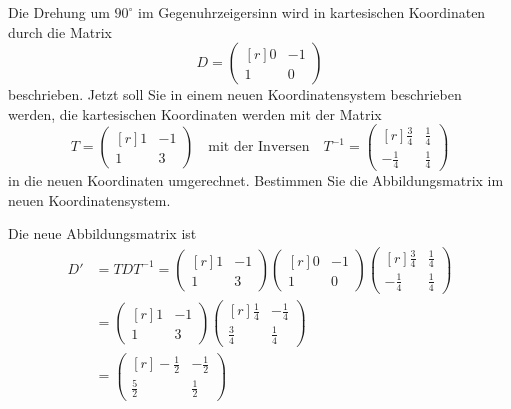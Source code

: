 Die Drehung um $90^\circ$ im Gegenuhrzeigersinn wird in kartesischen
Koordinaten durch die Matrix
\[
\renewcommand{\arraystretch}{1.2}
D
=
\begin{pmatrix*}[r]
0&-1\\
1& 0
\end{pmatrix*}
\]
beschrieben.
Jetzt soll Sie in einem neuen Koordinatensystem beschrieben werden,
die kartesischen Koordinaten werden mit der Matrix
\[
\renewcommand{\arraystretch}{1.2}
T
=
\begin{pmatrix*}[r]
1&-1\\
1& 3
\end{pmatrix*}
\quad\text{mit der Inversen}\quad
T^{-1}
=
\begin{pmatrix*}[r]
 \frac34&\frac14\\
-\frac14&\frac14
\end{pmatrix*}
\]
in die neuen Koordinaten umgerechnet.
Bestimmen Sie die Abbildungsmatrix im neuen Koordinatensystem.

\begin{loesung}
Die neue Abbildungsmatrix ist
\renewcommand{\arraystretch}{1.2}
\begin{align*}
D'
&=
TDT^{-1}
=
\begin{pmatrix*}[r]
1&-1\\
1& 3
\end{pmatrix*}
\begin{pmatrix*}[r]
0&-1\\
1& 0
\end{pmatrix*}
\begin{pmatrix*}[r]
 \frac34&\frac14\\
-\frac14&\frac14
\end{pmatrix*}
\\
&=
\begin{pmatrix*}[r]
1&-1\\
1& 3
\end{pmatrix*}
\begin{pmatrix*}[r]
\frac14&-\frac14\\
\frac34& \frac14
\end{pmatrix*}
\\
&=
\begin{pmatrix*}[r]
-\frac12&-\frac12\\
\frac52&\frac12
\end{pmatrix*}
\end{align*}
\end{loesung}
